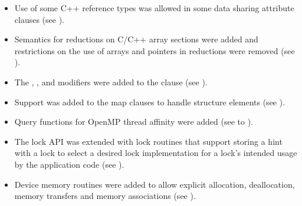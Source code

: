 \begin{itemize}
\item Use of some C++ reference types was allowed in some data sharing 
      attribute clauses (see ).

\item Semantics for reductions on C/C++ array sections were added and 
      restrictions on the use of arrays and pointers in reductions were 
      removed (see ).
      
\item The , , and  modifiers were added to the
       clause (see ).
      
\item Support was added to the map clauses to handle structure elements 
	(see ).
	  
\item Query functions for OpenMP thread affinity were added (see 
       to ).

\item The lock API was extended with lock routines that support storing a hint
      with a lock to select a desired lock implementation for a lock's intended usage
      by the application code (see ).

\item Device memory routines were added to allow explicit allocation, 
      deallocation, memory transfers and memory associations (see
      ).

\end{itemize}



